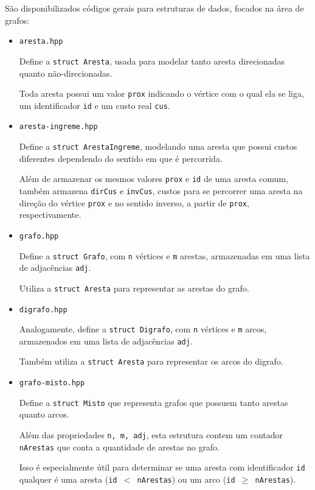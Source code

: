 São disponibilizados códigos gerais para estruturas de dados, focados na área de grafos:
\begin{itemize}
    \item \texttt{aresta.hpp} 

        Define a \texttt{struct Aresta}, usada para modelar tanto aresta direcionadas quanto não-direcionadas.

    Toda aresta possui um valor  \texttt{prox} indicando o vértice com o qual ela se liga, um identificador \texttt{id} e um custo real \texttt{cus}.
    \item \texttt{aresta-ingreme.hpp}

        Define a \texttt{struct ArestaIngreme}, modelando uma aresta que possui custos diferentes dependendo do sentido em que é percorrida.

        Além de armazenar os mesmos valores \texttt{prox} e \texttt{id} de uma aresta comum, também armazena \texttt{dirCus} e \texttt{invCus}, custos para se percorrer uma aresta na direção do vértice \texttt{prox} e no sentido inverso, a partir de \texttt{prox}, respectivamente.

    \item \texttt{grafo.hpp} 
        
        Define a \texttt{struct Grafo}, com \texttt{n} vértices e \texttt{m} arestas, armazenadas em uma lista de adjacências \texttt{adj}.

        Utiliza a \texttt{struct Aresta} para representar as arestas do grafo.

    \item \texttt{digrafo.hpp}

        Analogamente, define a \texttt{struct Digrafo}, com \texttt{n} vértices e \texttt{m} arcos, armazenados em uma lista de adjacências \texttt{adj}.

        Também utiliza a \texttt{struct Aresta} para representar os arcos do digrafo.

    \item \texttt{grafo-misto.hpp}

        Define a \texttt{struct Misto} que representa grafos que possuem tanto arestas quanto arcos. 

        Além das propriedades \texttt{n, m, adj}, esta estrutura contem um contador \texttt{nArestas} que conta a quantidade de arestas no grafo.

        Isso é especialmente útil para determinar se uma aresta com identificador \texttt{id} qualquer é uma aresta (\texttt{id $<$ nArestas}) ou um arco (\texttt{id $\geq$ nArestas}).


\end{itemize}
